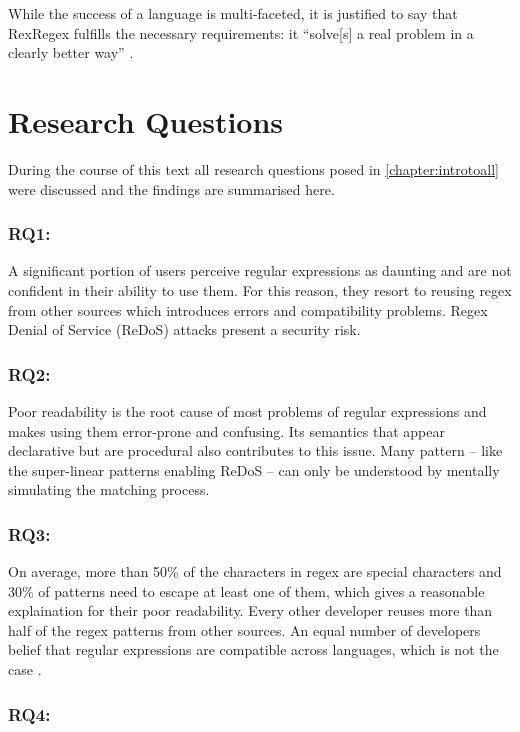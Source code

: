 While the success of a language is multi-faceted, it is justified to say that RexRegex fulfills the necessary requirements: it \enquote{solve[s] a real problem in a clearly better way} \cite{OnSuccessfulLanuageDesignKernighan}.

\section{Research Questions}

During the course of this text all research questions posed in \ref{chapter:introtoall} were discussed and the findings are summarised here.

\subsubsection{RQ1: \RQone}

A significant portion of users perceive regular expressions as daunting and are not confident in their ability to use them. For this reason, they resort to reusing regex from other sources which introduces errors and compatibility problems. Regex Denial of Service (ReDoS) attacks present a security risk.

\subsubsection{RQ2: \RQtwo}

Poor readability is the root cause of most problems of regular expressions and makes using them error-prone and confusing. Its semantics that appear declarative but are procedural also contributes to this issue. Many pattern -- like the super-linear patterns enabling ReDoS -- can only be understood by mentally simulating the matching process. 

\subsubsection{RQ3: \RQthree}

On average, more than 50\% of the characters in regex are special characters and 30\% of patterns need to escape at least one of them, which gives a reasonable explaination for their poor readability. Every other developer reuses more than half of the regex patterns from other sources. An equal number of developers belief that regular expressions are compatible across languages, which is not the case \cite{RegexNotLinguaFranca}.

\subsubsection{RQ4: \RQfour}

